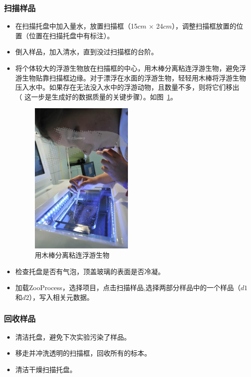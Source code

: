 \documentclass[12pt]{article}
\begin{document}
\subsubsection{扫描样品}
\begin{itemize}
\item 在扫描托盘中加入量水，放置扫描框（15$cm$ $\times$ 24$cm$），调整扫描框放置的位置（位置在扫描托盘中有标注）。
\item 倒入样品，加入清水，直到没过扫描框的台阶。
\item 将个体较大的浮游生物放在扫描框的中心，用木棒分离粘连浮游生物，避免浮游生物贴靠扫描框边缘。对于漂浮在水面的浮游生物，轻轻用木棒将浮游生物压入水中。如果存在无法没入水中的浮游动物，且数量不多，则将它们移出 （{\color{blue} 这一步是生成好的数据质量的关键步骤}）。如图~\ref{fig:sticks}。
  \begin{figure}[!ht]
  \centering
   \includegraphics[width=2.0in]{sticks}
    \caption{用木棒分离粘连浮游生物}
    \label{fig:sticks}
   \end{figure}
\item 检查托盘是否有气泡，顶盖玻璃的表面是否冷凝。
\item 加载ZooProcess，选择项目，点击扫描样品,选择两部分样品中的一个样品（$d1$和$d2$），写入相关元数据。
\end{itemize}

\subsubsection{回收样品}
\begin{itemize}
\item 清洁托盘，避免下次实验污染了样品。
\item 移走并冲洗透明的扫描框，回收所有的标本。
\item 清洁干燥扫描托盘。
\end{itemize}
\end{document}

